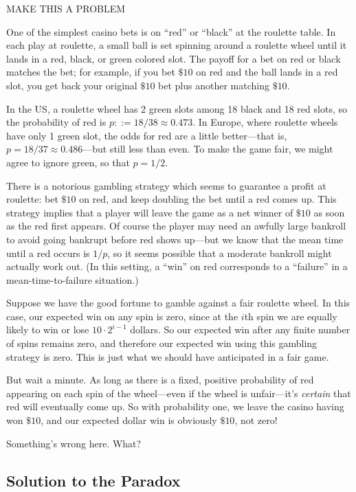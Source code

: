 \begin{editingnotes}

MAKE THIS A PROBLEM

One of the simplest casino bets is on ``red'' or ``black'' at the roulette
table.  In each play at roulette, a small ball is set spinning around a
roulette wheel until it lands in a red, black, or green colored slot.
The payoff for a bet on red or black matches the bet; for example, if you bet
$\$10$ on red and the ball lands in a red slot, you get back your original
$\$10$ bet plus another matching $\$10$.

In the US, a roulette wheel has 2 green slots among 18 black and 18 red
slots, so the probability of red is $p::= 18/38 \approx 0.473$.  In
Europe, where roulette wheels have only 1 green slot, the odds for red
are a little better---that is, $p = 18/37 \approx 0.486$---but still less
than even.  To make the game fair, we might agree to ignore green, so that
$p = 1/2$.

There is a notorious gambling strategy which seems to guarantee a profit
at roulette: bet $\$10$ on red, and keep doubling the bet until a red
comes up.  This strategy implies that a player will leave the game as a
net winner of $\$10$ as soon as the red first appears.  Of course the
player may need an awfully large bankroll to avoid going bankrupt before
red shows up---but we know that the mean time until a red occurs is $1/p$,
so it seems possible that a moderate bankroll might actually work out.
(In this setting, a ``win'' on red corresponds to a ``failure'' in a
mean-time-to-failure situation.)

Suppose we have the good fortune to gamble against a fair roulette wheel.
In this case, our expected win on any spin is zero, since at the $i$th
spin we are equally likely to win or lose $10 \cdot 2^{i-1}$ dollars.  So
our expected win after any finite number of spins remains zero, and
therefore our expected win using this gambling strategy is zero.  This is
just what we should have anticipated in a fair game.

But wait a minute.  As long as there is a fixed, positive probability of
red appearing on each spin of the wheel---even if the wheel is
unfair---it's \emph{certain} that red will eventually come up.  So with
probability one, we leave the casino having won $\$10$, and our expected
dollar win is obviously $\$10$, not zero!

Something's wrong here.  What?

\subsection{Solution to the Paradox}


\end{editingnotes}
